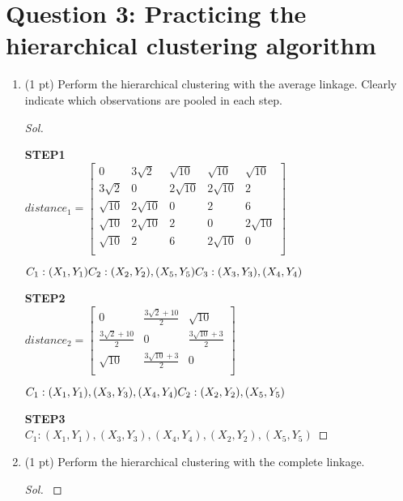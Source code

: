 \documentclass[11pt, oneside]{article}   	%
\newenvironment{Solution}[1][Sol]{%
  \begin{proof}[#1]$ $\par\nobreak\ignorespaces
	\qquad
}{%
  \end{proof}
}
\begin{document}
\section*{Question 3: Practicing the hierarchical clustering algorithm}


\begin{enumerate}[resume*]
	\item (1 pt) Perform the hierarchical clustering with the average linkage. 
							Clearly indicate which observations are pooled in each step.
	\begin{Solution}

\textbf{STEP1}\\
		$distance_{1}=\left[\begin{array}{ccccc}
		0 & 3\sqrt{2} & \sqrt{10} & \sqrt{10} & \sqrt{10}\\
		3\sqrt{2} & 0 & 2\sqrt{10} & 2\sqrt{10} & 2\\
		\sqrt{10} & 2\sqrt{10} & 0 & 2 & 6 \\
		\sqrt{10}  & 2\sqrt{10} & 2 & 0 & 2\sqrt{10}\\
		\sqrt{10} & 2 & 6 & 2\sqrt{10} & 0\\
		\end{array}\right]$
		
		$ C_1:(X_1,Y_1)\\
		C_2:(X_2,Y_2),(X_5,Y_5)\\
		C_3:(X_3,Y_3),(X_4,Y_4)$
		
\textbf{STEP2}\\
		$distance_{2}=\left[\begin{array}{ccccc}
		0 & \frac{3\sqrt{2}+10}{2} & \sqrt{10}\\
		\frac{3\sqrt{2}+10}{2} & 0 & \frac{3\sqrt{10}+3}{2}\\
		\sqrt{10} & \frac{3\sqrt{10}+3}{2} & 0\\
		\end{array}\right]$
		
		$ C_1:(X_1,Y_1),(X_3,Y_3),(X_4,Y_4)\\C_2:(X_2,Y_2),(X_5,Y_5)$
		
		
\textbf{STEP3}\\
		$ C_1:(X_1,Y_1),(X_3,Y_3),(X_4,Y_4),(X_2,Y_2),(X_5,Y_5)$	
		
		
	
		
	\end{Solution}
	\item (1 pt) Perform the hierarchical clustering with the complete linkage.
	\begin{Solution}
	

\end{Solution}
\end{enumerate}
\end{document}
